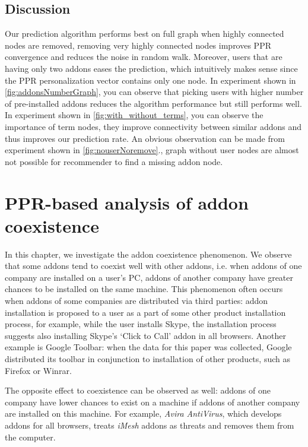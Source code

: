 \documentclass[11pt,oneside]{book}
\let\Oldsection\section
\renewcommand{\section}{\FloatBarrier\Oldsection}
\begin{document}
\section{Discussion}
Our prediction algorithm performs best on full graph when highly
connected nodes are removed, removing very highly connected nodes
improves PPR convergence and reduces the noise in random walk.
Moreover, users that are having only two addons eases the prediction,
which intuitively makes sense since the PPR personalization vector
contains only one node. In experiment shown in
\autoref{fig:addonsNumberGraph}, you can observe that picking users
with higher number of pre-installed addons reduces the algorithm
performance but still performs well. In experiment shown in
\autoref{fig:with_without_terms}, you can observe the importance of
term nodes, they improve connectivity between similar addons and thus
improves our prediction rate. An obvious observation can be made from
experiment shown in \autoref{fig:nouserNoremove}., graph without user
nodes are almost not possible for recommender to find a missing addon
node.


\chapter{PPR-based analysis of addon coexistence}
\label{chap:Symbiosis}

In this chapter, we investigate the addon coexistence phenomenon. We observe that some addons tend to coexist well with other addons, i.e. when addons of one company are installed on a user's PC, addons of another company have greater chances to be installed on the same machine.  This phenomenon often occurs when addons of some companies are distributed via third parties: addon installation is proposed to a user as a part of some other product installation process, for example, while the user installs Skype, the installation process suggests also installing Skype's `Click to Call' addon in all browsers. Another example is Google Toolbar: when the data for this paper was collected, Google distributed its toolbar in conjunction to installation of other products, such as Firefox or Winrar.

The opposite effect to coexistence can be observed as well: addons of one company have lower chances to exist on a machine if addons of another company are installed on this machine. For example, \emph{Avira AntiVirus}, which develops addons for all browsers, treats \emph{iMesh} addons as threats and removes them from the computer.
\end{document}
